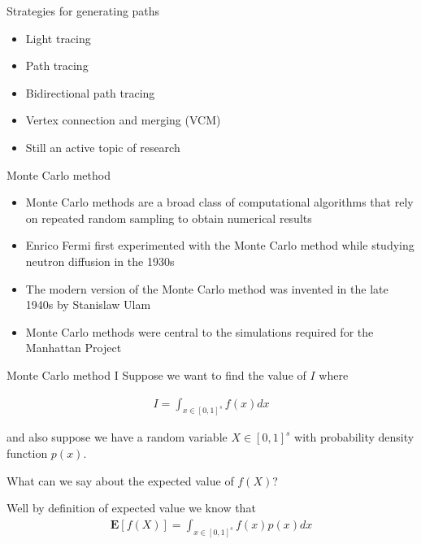 \documentclass[pdf]
{beamer}
\begin{document}
\begin{frame}{Strategies for generating paths}
  \begin{itemize}
    \pause
  \item Light tracing
    \pause
  \item Path tracing
    \pause
  \item Bidirectional path tracing
    \pause
  \item Vertex connection and merging (VCM)
    \pause
  \item Still an active topic of research
  \end{itemize}
\end{frame}

\begin{frame}{Monte Carlo method}
  \begin{itemize}
    \pause
  \item Monte Carlo methods are a broad class of computational algorithms that rely on repeated random sampling to obtain numerical results
    \pause
  \item Enrico Fermi first experimented with the Monte Carlo method while studying neutron diffusion in the 1930s
    \pause
  \item The modern version of the Monte Carlo method was invented in the late 1940s by Stanislaw Ulam
    \pause
  \item Monte Carlo methods were central to the simulations required for the Manhattan Project
  \end{itemize}
\end{frame}

\begin{frame}{Monte Carlo method I}
  Suppose we want to find the value of $I$ where

  \bigskip
  \begin{align*}
    I = \int_{x \in [0, 1]^s} f(x) dx
  \end{align*}
  \bigskip

  \pause
  and also suppose we have a random variable $X \in [0, 1]^s$ with probability density function $p(x)$.

  \pause
  \bigskip
  What can we say about the expected value of $f(X)$?

  \pause
  \bigskip
  Well by definition of expected value we know that
  \bigskip
  \begin{align*}
    \mathbf{E}[f(X)] = \int_{x \in [0, 1]^s} f(x) p(x) dx
  \end{align*}
\end{frame}
\end{document}
